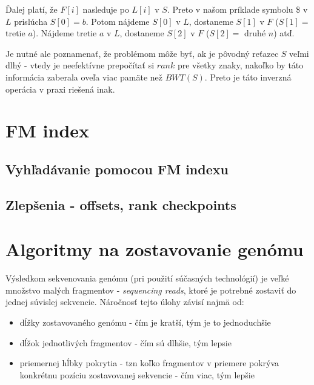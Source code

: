     Ďalej platí, že $F[i]$ nasleduje po $L[i]$ v $S$. Preto v našom príklade
    symbolu \$ v $L$ prislúcha $S[0] = b$. Potom nájdeme $S[0]$ v $L$, dostaneme
    $S[1]$ v $F$ ($S[1] =$ tretie $a$). Nájdeme tretie $a$ v $L$, dostaneme
    $S[2]$ v $F$ ($S[2] =$ druhé $n$) atď.
    
    Je nutné ale poznamenať, že problémom môže byť, ak je pôvodný reťazec $S$
    veľmi dlhý - vtedy je neefektívne prepočítať si $rank$ pre všetky znaky,
    nakoľko by táto informácia zaberala oveľa viac pamäte než $BWT(S)$. Preto je
    táto inverzná operácia v praxi riešená inak. 

    
\section{FM index}  
    \todo{} %

    \subsection{Vyhľadávanie pomocou FM indexu}
    \todo{} %
    
    \subsection{Zlepšenia - offsets, rank checkpoints}
    \todo{} %
    
\section{Algoritmy na zostavovanie genómu}
    Výsledkom sekvenovania genómu (pri použití súčasných technológií) je veľké
    množstvo malých fragmentov - \emph{sequencing reads}, ktoré je potrebné
    zostaviť do jednej súvislej sekvencie. Náročnosť tejto úlohy závisí najmä
    od:
    
    \begin{itemize}
        \item dĺžky zostavovaného genómu - čím je kratší, tým je to jednoduchšie
        \item dĺžok jednotlivých fragmentov - čím sú dlhšie, tým lepsie
        \item priemernej hĺbky pokrytia - tzn koľko fragmentov v priemere
        pokrýva konkrétnu pozíciu zostavovanej sekvencie - čím viac, tým lepšie
    \end{itemize}


